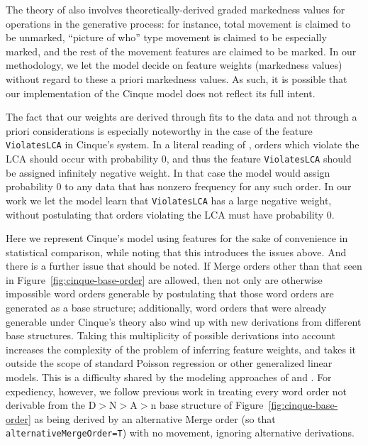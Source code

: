 \documentclass[11pt]{article}
\newcommand{\alternativeMergeOrder}{\texttt{alternativeMergeOrder}\xspace}
\begin{document}
The theory of \citet{cinque2005deriving} also involves theoretically-derived graded markedness values for operations in the generative process: for instance, total movement is claimed to be unmarked, ``picture of who'' type movement is claimed to be especially marked, and the rest of the movement features are claimed to be marked.
In our methodology, we let the model decide on feature weights (markedness values) without regard to these a priori markedness values.
As such, it is possible that our implementation of the Cinque model
does not reflect its full intent. 

The fact that our weights are derived through fits to the data and not through a priori considerations is especially noteworthy in the case of the feature \texttt{ViolatesLCA} in Cinque's system.
In a literal reading of \citet{cinque2005deriving}, orders which violate the LCA should occur with probability 0, and thus the feature \texttt{ViolatesLCA} should be assigned infinitely negative weight.
In that case the model would assign probability 0 to any data that has nonzero frequency for any such order.
In our work we let the model learn that \texttt{ViolatesLCA} has a large negative weight, without postulating that orders violating the LCA must have probability 0.

Here we represent Cinque's model using features for the sake of
convenience in statistical comparison, while noting that this
introduces the issues above.  And there is a further issue that should
be noted.  If Merge orders other than that seen in
Figure~\ref{fig:cinque-base-order} are allowed, then not only are
otherwise impossible word orders generable by postulating that those
word orders are generated as a base structure; additionally, word
orders that were already generable under Cinque's theory also wind up
with new derivations from different base structures.  Taking this
multiplicity of possible derivations into account increases the
complexity of the problem of inferring feature weights, and takes it
outside the scope of standard Poisson regression or other generalized
linear models.  This is a difficulty shared by the modeling approaches
of \citet{cysouw2010towards} and \citet{merlo2015predicting}.  For
expediency, however, we follow previous work in treating every word
order not derivable from the D$>$N$>$A$>$n base structure of
Figure~\ref{fig:cinque-base-order} as being derived by an alternative
Merge order (so that \alternativeMergeOrder\texttt{=T}) with no
movement, ignoring alternative derivations.
\end{document}
